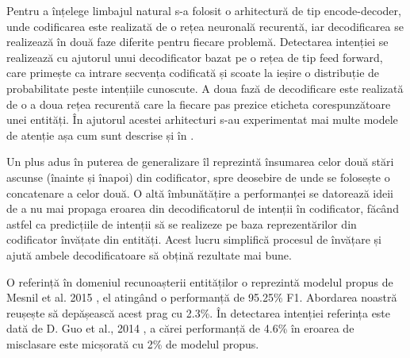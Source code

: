 Pentru a înțelege limbajul natural s-a folosit o arhitectură de tip encode-decoder, unde codificarea este realizată de o rețea neuronală recurentă, iar decodificarea se realizează în două faze diferite pentru fiecare problemă. Detectarea intenției se realizează cu ajutorul unui decodificator bazat pe o rețea de tip feed forward, care primește ca intrare secvența codificată și scoate la ieșire o distribuție de probabilitate peste intențiile cunoscute. A doua fază de decodificare este realizată de o a doua rețea recurentă care la fiecare pas prezice eticheta corespunzătoare unei entități. În ajutorul acestei arhitecturi s-au experimentat mai multe modele de atenție așa cum sunt descrise și în \cite{trans_luong_manning}.

Un plus adus în puterea de generalizare îl reprezintă însumarea celor două stări ascunse (înainte și înapoi) din codificator, spre deosebire de \cite{att_joint_bing} unde se folosește o concatenare a celor două. O altă îmbunătățire a performanței se datorează ideii de a nu mai propaga eroarea din decodificatorul de intenții în codificator, făcând astfel ca predicțiile de intenții să se realizeze pe baza reprezentărilor din codificator învățate din entități. Acest lucru simplifică procesul de învățare și ajută ambele decodificatoare să obțină rezultate mai bune.

O referință în domeniul recunoașterii entităților o reprezintă modelul propus de Mesnil et al. 2015 \cite{mesnil-rnn-crf}, el atingând o performanță de 95.25\% F1. Abordarea noastră reușește să depășească acest prag cu 2.3\%. În detectarea intenției referința este dată de  D. Guo et al., 2014 \cite{recursive-nn-intent}, a cărei performanță de 4.6\% în eroarea de misclasare este micșorată cu 2\% de modelul propus.

